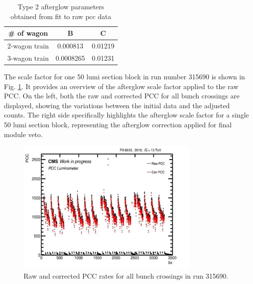 \newpage
\begin{table}
  \centering
  \caption[Type 2 afterglow parameters estimation]{Type 2 afterglow parameters obtained from fit to raw pcc data}
  \begin{tabular}{ccc}
    \textbf{\# of wagon} & \textbf{B} & \textbf{C} \\
     \hline
   2-wagon train  & 0.000813 &  0.01219\\
   3-wagon train  & 0.0008265 &  0.01231\\
  \end{tabular}
  \label{fig:af_fit4000}
\end{table}

The scale factor for one 50 lumi section block in run number 315690 is shown in Fig. \ref{fig:af_change_veto}. It provides an overview of the afterglow scale factor applied to the raw PCC. On the left, both the raw and corrected PCC for all bunch crossings are displayed, showing the variations between the initial data and the adjusted counts. The right side specifically highlights the afterglow scale factor for a single 50 lumi section block, representing the afterglow correction applied for final module veto.

\newpage
\begin{figure}[H]
\centering
\includegraphics[width=0.8\textwidth]{ashish_thesis/afterglow_correction_factor_1lsblock_315690_2.png}
\caption[Run 315690 PCC without and with afterglow correction]{%
 Raw and corrected PCC rates for all bunch crossings in run 315690.
}
\label{fig:af_change_veto}
\end{figure}

